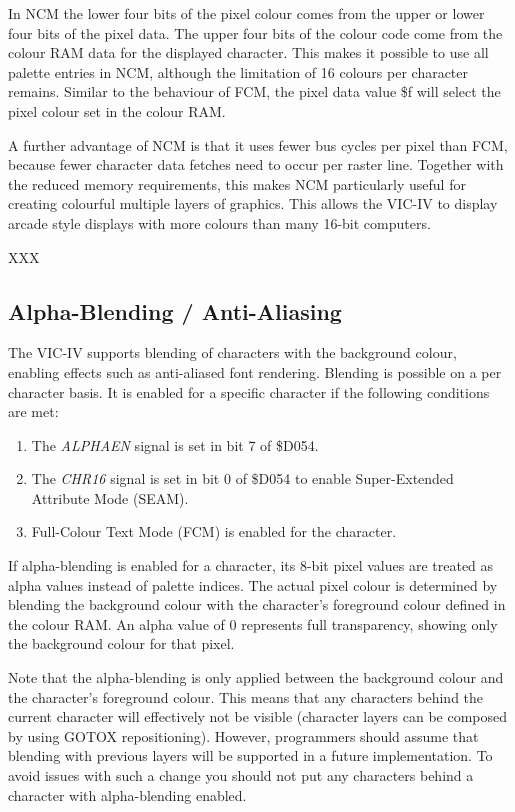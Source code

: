 In NCM the lower four bits of the pixel colour comes from the upper or lower four bits of the pixel data.  The upper four bits of the colour code come from the colour RAM data for the displayed character.  This makes it possible to use all palette entries in NCM, although the limitation of 16 colours per character remains. Similar to the behaviour of FCM, the pixel data value \$f will select the pixel colour set in the colour RAM.

A further advantage of NCM is that it uses fewer bus cycles per pixel than FCM, because fewer character data fetches need to occur per raster line.  Together with the reduced memory requirements, this makes NCM particularly useful for creating colourful multiple layers of graphics.  This allows the VIC-IV to display arcade style displays with more colours than many 16-bit computers.


XXX

\subsection{Alpha-Blending / Anti-Aliasing}

The VIC-IV supports blending of characters with the background colour, enabling effects such as anti-aliased font rendering. Blending is possible on a per character basis. It is enabled for a specific character if the following conditions are met:
\begin{enumerate}
  \item The {\em ALPHAEN} signal is set in bit 7 of \$D054.
  \item The {\em CHR16} signal is set in bit 0 of \$D054 to enable Super-Extended Attribute Mode (SEAM).
  \item Full-Colour Text Mode (FCM) is enabled for the character.
\end{enumerate}
If alpha-blending is enabled for a character, its 8-bit pixel values are treated as alpha values instead of palette indices. The actual pixel colour is determined by blending the background colour with the character's foreground colour defined in the colour RAM. An alpha value of 0 represents full transparency, showing only the background colour for that pixel.

Note that the alpha-blending is only applied between the background colour and the character's foreground colour. This means that any characters behind the current character will effectively not be visible (character layers can be composed by using GOTOX repositioning). However, programmers should assume that blending with previous layers will be supported in a future implementation. To avoid issues with such a change you should not put any characters behind a character with alpha-blending enabled.



